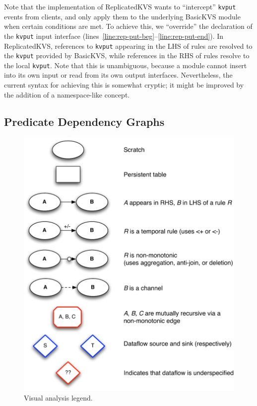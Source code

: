 Note that the implementation of ReplicatedKVS wants to ``intercept''
\texttt{kvput} events from clients, and only apply them to the underlying
BasicKVS module when certain conditions are met. To achieve this, we
``override'' the declaration of the \texttt{kvput} input interface
(lines~\ref{line:rep-put-beg}--\ref{line:rep-put-end}). In ReplicatedKVS,
references to \texttt{kvput} appearing in the LHS of rules are resolved to the
\texttt{kvput} provided by BasicKVS, while references in the RHS of rules
resolve to the local \texttt{kvput}.  Note that this is unambiguous, because a
module cannot insert into its own input or read from its own output
interfaces. Nevertheless, the current syntax for achieving this is somewhat
cryptic; it might be improved by the addition of a namespace-like concept.

\subsection{Predicate Dependency Graphs}
\begin{figure}[t]
\centering
\includegraphics[width=0.9\linewidth]{fig/mittalk_legend.pdf}
\vspace{-10pt}
\caption{Visual analysis legend. }
\label{fig:analysis-legend}
\vspace{-2pt}
\end{figure}

